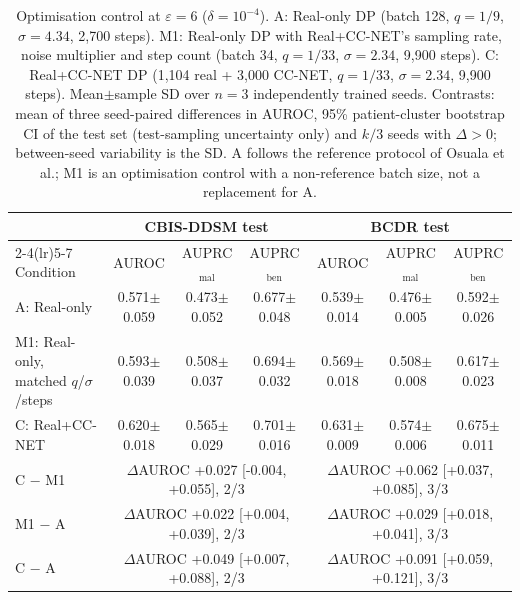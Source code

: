 \begin{table}[t]\centering\scriptsize\setlength{\tabcolsep}{2.2pt}
\caption{Optimisation control at $\varepsilon=6$ ($\delta=10^{-4}$). A: Real-only DP (batch 128, $q=1/9$, $\sigma=4.34$, 2{,}700 steps). M1: Real-only DP with Real+CC-NET's sampling rate, noise multiplier and step count (batch 34, $q=1/33$, $\sigma=2.34$, 9{,}900 steps). C: Real+CC-NET DP (1{,}104 real + 3{,}000 CC-NET, $q=1/33$, $\sigma=2.34$, 9{,}900 steps). Mean$\pm$sample SD over $n=3$ independently trained seeds. Contrasts: mean of three seed-paired differences in AUROC, 95\% patient-cluster bootstrap CI of the test set (test-sampling uncertainty only) and $k/3$ seeds with $\Delta>0$; between-seed variability is the SD. A follows the reference protocol of Osuala et al.; M1 is an optimisation control with a non-reference batch size, not a replacement for A.}
\label{tab:m1}
\begin{tabular}{lcccccc}
\toprule
 & \multicolumn{3}{c}{CBIS-DDSM test} & \multicolumn{3}{c}{BCDR test} \\
\cmidrule(lr){2-4}\cmidrule(lr){5-7}
Condition & AUROC & AUPRC$_\mathrm{mal}$ & AUPRC$_\mathrm{ben}$ & AUROC & AUPRC$_\mathrm{mal}$ & AUPRC$_\mathrm{ben}$ \\
\midrule
A: Real-only & 0.571$\pm$0.059 & 0.473$\pm$0.052 & 0.677$\pm$0.048 & 0.539$\pm$0.014 & 0.476$\pm$0.005 & 0.592$\pm$0.026 \\
M1: Real-only, matched $q$/$\sigma$/steps & 0.593$\pm$0.039 & 0.508$\pm$0.037 & 0.694$\pm$0.032 & 0.569$\pm$0.018 & 0.508$\pm$0.008 & 0.617$\pm$0.023 \\
C: Real+CC-NET & 0.620$\pm$0.018 & 0.565$\pm$0.029 & 0.701$\pm$0.016 & 0.631$\pm$0.009 & 0.574$\pm$0.006 & 0.675$\pm$0.011 \\
\midrule
C $-$ M1 & \multicolumn{3}{c}{$\Delta$AUROC +0.027 [-0.004, +0.055], 2/3} & \multicolumn{3}{c}{$\Delta$AUROC +0.062 [+0.037, +0.085], 3/3} \\
M1 $-$ A & \multicolumn{3}{c}{$\Delta$AUROC +0.022 [+0.004, +0.039], 2/3} & \multicolumn{3}{c}{$\Delta$AUROC +0.029 [+0.018, +0.041], 3/3} \\
C $-$ A & \multicolumn{3}{c}{$\Delta$AUROC +0.049 [+0.007, +0.088], 2/3} & \multicolumn{3}{c}{$\Delta$AUROC +0.091 [+0.059, +0.121], 3/3} \\
\bottomrule
\end{tabular}
\end{table}
